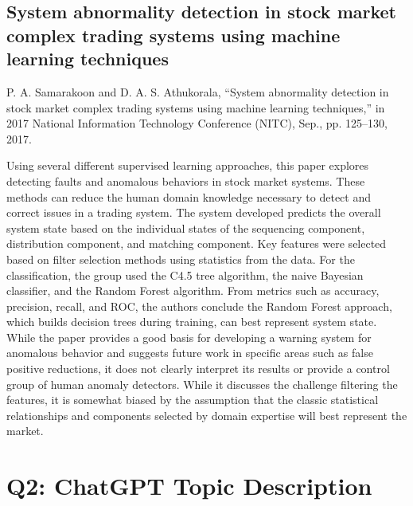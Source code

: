 \documentclass[12pt]{article}
\begin{document}
\subsection{System abnormality detection in stock market complex trading systems using machine learning techniques}
P. A. Samarakoon and D. A. S. Athukorala, “System abnormality detection in stock market complex trading systems using machine learning techniques,” in 2017 National Information Technology Conference (NITC), Sep., pp. 125–130, 2017. %
\newline

Using several different supervised learning approaches, this paper explores detecting faults and anomalous behaviors in stock market systems. These methods can reduce the human domain knowledge necessary to detect and correct issues in a trading system. The system developed predicts the overall system state based on the individual states of the sequencing component, distribution component, and matching component. Key features were selected based on filter selection methods using statistics from the data. For the classification, the group used the C4.5 tree algorithm, the naive Bayesian classifier, and the Random Forest algorithm. From metrics such as accuracy, precision, recall, and ROC, the authors conclude the Random Forest approach, which builds decision trees during training, can best represent system state. While the paper provides a good basis for developing a warning system for anomalous behavior and suggests future work in specific areas such as false positive reductions, it does not clearly interpret its results or provide a control group of human anomaly detectors. While it discusses the challenge filtering the features, it is somewhat biased by the assumption that the classic statistical relationships and components selected by domain expertise will best represent the market.





\section{Q2: ChatGPT Topic Description}


\end{document}
